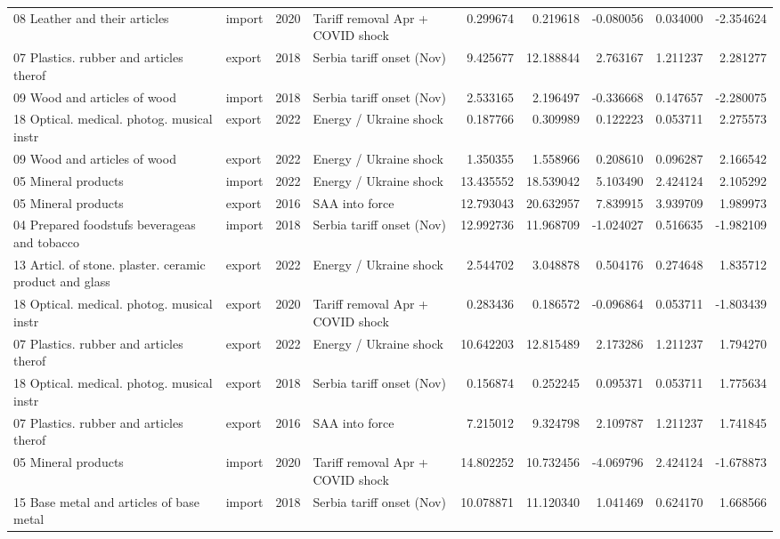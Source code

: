 \begin{tabular}{llrlrrrrr}
08 Leather and their articles & import & 2020 & Tariff removal Apr + COVID shock & 0.299674 & 0.219618 & -0.080056 & 0.034000 & -2.354624 \\
07 Plastics. rubber and articles therof & export & 2018 & Serbia tariff onset (Nov) & 9.425677 & 12.188844 & 2.763167 & 1.211237 & 2.281277 \\
09 Wood and articles of wood & import & 2018 & Serbia tariff onset (Nov) & 2.533165 & 2.196497 & -0.336668 & 0.147657 & -2.280075 \\
18 Optical. medical. photog. musical instr & export & 2022 & Energy / Ukraine shock & 0.187766 & 0.309989 & 0.122223 & 0.053711 & 2.275573 \\
09 Wood and articles of wood & export & 2022 & Energy / Ukraine shock & 1.350355 & 1.558966 & 0.208610 & 0.096287 & 2.166542 \\
05 Mineral products & import & 2022 & Energy / Ukraine shock & 13.435552 & 18.539042 & 5.103490 & 2.424124 & 2.105292 \\
05 Mineral products & export & 2016 & SAA into force & 12.793043 & 20.632957 & 7.839915 & 3.939709 & 1.989973 \\
04 Prepared foodstufs beverageas and tobacco & import & 2018 & Serbia tariff onset (Nov) & 12.992736 & 11.968709 & -1.024027 & 0.516635 & -1.982109 \\
13 Articl. of stone. plaster. ceramic product and glass & export & 2022 & Energy / Ukraine shock & 2.544702 & 3.048878 & 0.504176 & 0.274648 & 1.835712 \\
18 Optical. medical. photog. musical instr & export & 2020 & Tariff removal Apr + COVID shock & 0.283436 & 0.186572 & -0.096864 & 0.053711 & -1.803439 \\
07 Plastics. rubber and articles therof & export & 2022 & Energy / Ukraine shock & 10.642203 & 12.815489 & 2.173286 & 1.211237 & 1.794270 \\
18 Optical. medical. photog. musical instr & export & 2018 & Serbia tariff onset (Nov) & 0.156874 & 0.252245 & 0.095371 & 0.053711 & 1.775634 \\
07 Plastics. rubber and articles therof & export & 2016 & SAA into force & 7.215012 & 9.324798 & 2.109787 & 1.211237 & 1.741845 \\
05 Mineral products & import & 2020 & Tariff removal Apr + COVID shock & 14.802252 & 10.732456 & -4.069796 & 2.424124 & -1.678873 \\
15 Base metal and articles of base metal & import & 2018 & Serbia tariff onset (Nov) & 10.078871 & 11.120340 & 1.041469 & 0.624170 & 1.668566 \\

\end{tabular}
